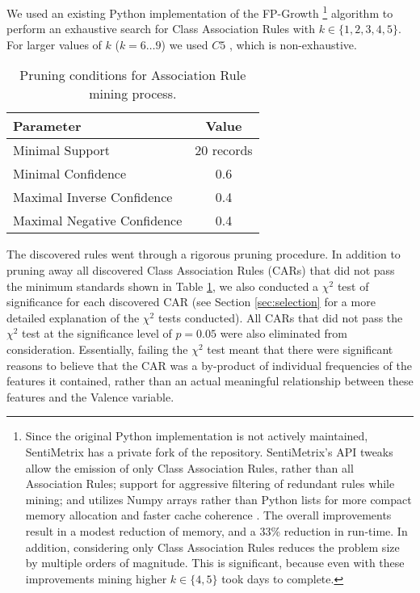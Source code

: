 We used an existing Python implementation \cite{python-fp-growth} of the \textsf{FP-Growth} \footnote{
Since the original Python implementation is not actively maintained, SentiMetrix has a private fork of the repository.
SentiMetrix's API tweaks allow the emission of only Class Association Rules, rather than all Association Rules;
 support for aggressive filtering of redundant rules while mining; and utilizes Numpy arrays rather than Python lists for more compact memory allocation and faster cache coherence \cite{numpy}. The overall improvements result in a modest reduction of memory, and a 33\% reduction in run-time. In addition, considering only Class Association Rules reduces the problem size by multiple orders of magnitude. This is significant, because even with these improvements mining higher $k \in \{4, 5\}$ took days to complete. 
 } \cite{fpgrowth} 
algorithm to perform an exhaustive search for Class Association Rules with
$k \in \{1,2,3,4,5\}$.  For larger values of $k$ ($k = 6\ldots 9$) we used
$C5$ \cite{c5,c45}, which is non-exhaustive.

\begin{table}
    \centering
    \begin{tabular}{|l|c|}
    \hline
    \textsf{Parameter} & \textsf{Value} \\
    \hline
    Minimal Support  &  20 records\\ 
    \hline
    Minimal Confidence & 0.6 \\
    Maximal Inverse Confidence & 0.4\\
    Maximal Negative Confidence& 0.4\\
    \hline
    \end{tabular}
    \caption{Pruning conditions for Association Rule mining process.}
    \label{tab:AR}
\end{table} 
 
  The discovered rules went through a rigorous pruning procedure. In addition
  to pruning away all discovered Class Association Rules (CARs) that did not
  pass the minimum standards shown in Table \ref{tab:AR}, we also conducted
  a $\chi^2$ test of significance for each discovered CAR (see Section \ref{sec:selection}
  for a more detailed explanation of the $\chi^2$ tests conducted). All CARs
  that did not pass the $\chi^2$ test at the significance level of
  $p=0.05$ were also eliminated from consideration. Essentially, failing
  the $\chi^2$ test meant that there were significant reasons to believe that 
  the CAR was a by-product of individual frequencies of the features it contained,
  rather than an actual meaningful relationship between these features and
  the \textsf{Valence} variable.
  
